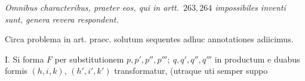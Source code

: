\begin{center}
\textit{Omnibus characteribus, praeter eos, qui in artt.\ $263,264$ impossibiles inventi sunt, genera revera respondent.}
\end{center}

Circa problema in art. praec. solutum sequentes adhuc annotationes adiicimus.

I. Si forma $F$ per substitutionem $p,p',p'',p''';\ q,q',q'',q'''$ in productum e duabus formis $(h,i,k)$, $(h',i',k')$ transformatur, (utraque uti semper suppo%
